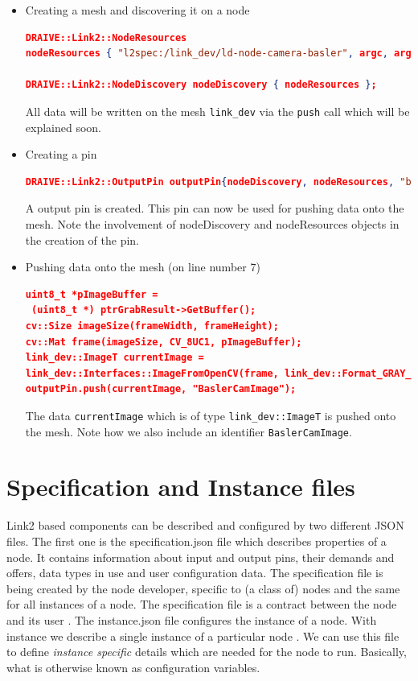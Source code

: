 \documentclass[a4paper, 12pt, oneside]{report}
\begin{document}
  \begin{itemize}
      \item Creating a mesh and discovering it on a node
      \begin{lstlisting}[language=json,firstnumber=1]
DRAIVE::Link2::NodeResources 
nodeResources { "l2spec:/link_dev/ld-node-camera-basler", argc, argv };
      
DRAIVE::Link2::NodeDiscovery nodeDiscovery { nodeResources };
      \end{lstlisting}
      
      All data will be written on the mesh \texttt{link\_dev} via the \texttt{push} call which will be explained soon.
      
      \item Creating a pin
      \begin{lstlisting}[language=json,firstnumber=1]
DRAIVE::Link2::OutputPin outputPin{nodeDiscovery, nodeResources, "basler-cam-output-pin"};
      \end{lstlisting}
      
      A output pin is created. This pin can now be used for pushing data onto the mesh. Note the involvement of nodeDiscovery and nodeResources objects in the creation of the pin.
      
      \item Pushing data onto the mesh (on line number 7)
      \begin{lstlisting}[language=json,firstnumber=1]
uint8_t *pImageBuffer =
 (uint8_t *) ptrGrabResult->GetBuffer();
cv::Size imageSize(frameWidth, frameHeight);
cv::Mat frame(imageSize, CV_8UC1, pImageBuffer);
link_dev::ImageT currentImage =
link_dev::Interfaces::ImageFromOpenCV(frame, link_dev::Format_GRAY_U8);   
outputPin.push(currentImage, "BaslerCamImage");
      \end{lstlisting}
      
      The data \texttt{currentImage} which is of type \texttt{link\_dev::ImageT} is pushed onto the mesh. Note how we also include an identifier \texttt{BaslerCamImage}. 
  \end{itemize}
  
  \section{Specification and Instance files}
  Link2 based components can be described and configured by two different JSON files.
  The first one is the specification.json file which describes properties of a node. It contains information about input and output pins, their demands and offers, data types in use and user configuration data. The specification file is being created by the node developer, specific to (a class of) nodes and the same for all instances of a node. The specification file is a contract between the node and its user \cite{SubscriptionandMappingDRAIVELinkDocumentation-2019-12-09}.
  The instance.json file configures the instance of a node. With instance we describe a single instance of a particular node \cite{SubscriptionandMappingDRAIVELinkDocumentation-2019-12-09}. We can use this file to define \textit{instance specific} details which are needed for the node to run. Basically, what is otherwise known as configuration variables. 
  
\end{document}
